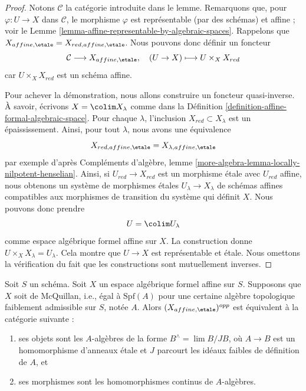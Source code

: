 \begin{proof}
Notons $\mathcal{C}$ la catégorie introduite dans le lemme.
Remarquons que, pour $\varphi : U \to X$ dans $\mathcal{C}$, le
morphisme $\varphi$ est représentable (par des schémas) et affine ; voir le
Lemme \ref{lemma-affine-representable-by-algebraic-spaces}.
Rappelons que $X_{affine, \etale} = X_{red, affine, \etale}$.
Nous pouvons donc définir un foncteur
$$
\mathcal{C} \longrightarrow X_{affine, \etale},\quad
(U \to X) \longmapsto U \times_X X_{red}
$$
car $U \times_X X_{red}$ est un schéma affine.

\medskip\noindent
Pour achever la démonstration, nous allons construire un foncteur quasi-inverse.
À savoir, écrivons $X = \colim X_\lambda$ comme dans la
Définition \ref{definition-affine-formal-algebraic-space}.
Pour chaque $\lambda$, l'inclusion $X_{red} \subset X_\lambda$
est un épaississement. Ainsi, pour tout $\lambda$, nous avons une
équivalence
$$
X_{red, affine, \etale} = X_{\lambda, affine, \etale}
$$
par exemple d'après
Compléments d'algèbre, lemme \ref{more-algebra-lemma-locally-nilpotent-henselian}.
Ainsi, si $U_{red} \to X_{red}$ est un morphisme \'etale avec
$U_{red}$ affine, nous obtenons un système de morphismes \'etales
$U_\lambda \to X_\lambda$ de schémas affines compatibles aux
morphismes de transition du système qui définit $X$. Nous pouvons donc prendre
$$
U = \colim U_\lambda
$$
comme espace algébrique formel affine sur $X$. La construction donne
$U \times_X X_\lambda = U_\lambda$. Cela montre que $U \to X$ est
représentable et \'etale. Nous omettons la vérification du fait que les constructions
sont mutuellement inverses.
\end{proof}

\begin{lemma}
\label{lemma-affine-etale-mcquillan}
Soit $S$ un schéma. Soit $X$ un espace algébrique
formel affine sur $S$. Supposons que $X$ soit de McQuillan, i.e.,
égal à $\text{Spf}(A)$ pour une certaine
algèbre topologique faiblement admissible sur $S$, notée $A$.
Alors $(X_{affine, \etale})^{opp}$ est équivalent à
la catégorie suivante :
\begin{enumerate}
\item ses objets sont les $A$-algèbres de la forme
$B^\wedge = \lim B/JB$, où $A \to B$ est un homomorphisme d'anneaux \'etale
et $J$ parcourt les idéaux faibles de définition de $A$, et
\item ses morphismes sont les homomorphismes continus de $A$-algèbres.
\end{enumerate}
\end{lemma}


